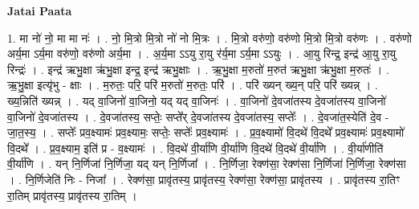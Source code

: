 \documentclass[17pt]{extarticle}
\begin{document}
\textbf{Jatai Paata} \newline

1. मा नो॑ नो॒ मा मा नः॑ । . नो॒ मि॒त्रो मि॒त्रो नो॑ नो मि॒त्रः । . मि॒त्रो वरु॑णो॒ वरु॑णो मि॒त्रो मि॒त्रो वरु॑णः । . वरु॑णो अर्य॒मा ऽर्य॒मा वरु॑णो॒ वरु॑णो अर्य॒मा । . अ॒र्य॒मा ऽऽयु रा॒यु र॑र्य॒मा ऽर्य॒मा ऽऽयुः । . आ॒यु रिन्द्र॒ इन्द्र॑ आ॒यु रा॒यु रिन्द्रः॑ । . इन्द्र॑ ऋभु॒क्षा ऋ॑भु॒क्षा इन्द्र॒ इन्द्र॑ ऋभु॒क्षाः । . ऋ॒भु॒क्षा म॒रुतो॑ म॒रुत॑ ऋभु॒क्षा ऋ॑भु॒क्षा म॒रुतः॑ । . ऋ॒भु॒क्षा इत्यृ॑भु - क्षाः । . म॒रुतः॒ परि॒ परि॑ म॒रुतो॑ म॒रुतः॒ परि॑ । . परि॑ ख्यन् ख्य॒न् परि॒ परि॑ ख्यन्न् । . ख्य॒न्निति॑ ख्यन्न् । . यद् वा॒जिनो॑ वा॒जिनो॒ यद् यद् वा॒जिनः॑ । . वा॒जिनो॑ दे॒वजा॑तस्य दे॒वजा॑तस्य वा॒जिनो॑ वा॒जिनो॑ दे॒वजा॑तस्य । . दे॒वजा॑तस्य॒ सप्तेः॒ सप्ते᳚र् दे॒वजा॑तस्य दे॒वजा॑तस्य॒ सप्तेः᳚ । . दे॒वजा॑त॒स्येति॑ दे॒व - जा॒त॒स्य॒ । . सप्तेः᳚ प्रव॒क्ष्यामः॑ प्रव॒क्ष्यामः॒ सप्तेः॒ सप्तेः᳚ प्रव॒क्ष्यामः॑ । . प्र॒व॒क्ष्यामो॑ वि॒दथे॑ वि॒दथे᳚ प्रव॒क्ष्यामः॑ प्रव॒क्ष्यामो॑ वि॒दथे᳚ । . प्र॒व॒क्ष्याम॒ इति॑ प्र - व॒क्ष्यामः॑ । . वि॒दथे॑ वी॒र्या॑णि वी॒र्या॑णि वि॒दथे॑ वि॒दथे॑ वी॒र्या॑णि । . वी॒र्या॑णीति॑ वी॒र्या॑णि । . यन् नि॒र्णिजा॑ नि॒र्णिजा॒ यद् यन् नि॒र्णिजा᳚ । . नि॒र्णिजा॒ रेक्ण॑सा॒ रेक्ण॑सा नि॒र्णिजा॑ नि॒र्णिजा॒ रेक्ण॑सा । . नि॒र्णिजेति॑ निः - निजा᳚ । . रेक्ण॑सा॒ प्रावृ॑तस्य॒ प्रावृ॑तस्य॒ रेक्ण॑सा॒ रेक्ण॑सा॒ प्रावृ॑तस्य । . प्रावृ॑तस्य रा॒तिꣳ रा॒तिम् प्रावृ॑तस्य॒ प्रावृ॑तस्य रा॒तिम् । \newline
\end{document}
